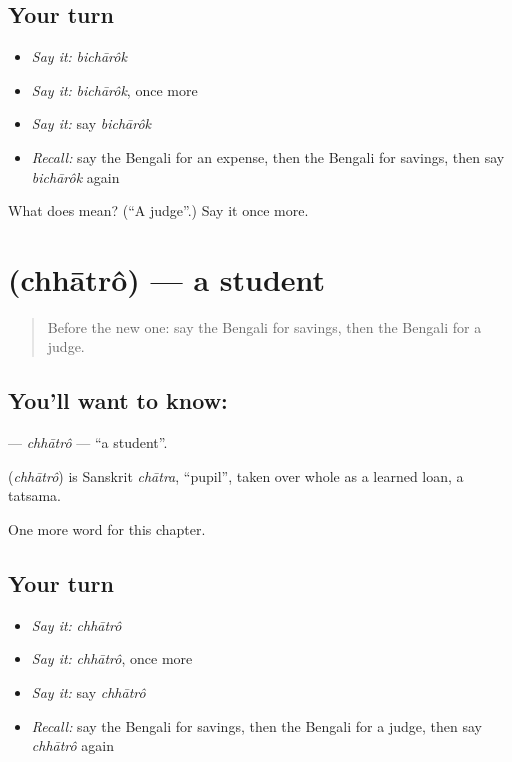 \subsection*{Your turn}
\begin{itemize}
\raggedright
  \item \emph{Say it:} \emph{bichārôk}
  \item \emph{Say it:} \emph{bichārôk}, once more
  \item \emph{Say it:} say \emph{bichārôk}
  \item \emph{Recall:} say the Bengali for an expense, then the Bengali for savings, then say \emph{bichārôk} again
\end{itemize}

\begin{tcolorbox}[breakable,colback=teal!4,colframe=teal!35!black,title={Before you move on}]
What does  mean? (\textquotedblleft{}A judge\textquotedblright{}.) Say it once more.
\end{tcolorbox}
\section[\texorpdfstring{\bn{ছাত্র} (chhātrô)}{ছাত্র (chhātrô)}]{ (chhātrô) — a student}

\label{lesson:BN-C177-chhatro}



\begin{quote}
Before the new one: say the Bengali for savings, then the Bengali for a judge.
\end{quote}

\subsection*{You'll want to know: }
\textbf{} — \emph{chhātrô} — \textquotedblleft{}a student\textquotedblright{}.

\begin{cousinweb}
\textbf{} (\emph{chhātrô}) is Sanskrit \emph{chātra}, \textquotedblleft{}pupil\textquotedblright{}, taken over whole as a learned loan, a tatsama.
\end{cousinweb}

\begin{grammarlens}[title={What you've built}]
One more word for this chapter.
\end{grammarlens}

\subsection*{Your turn}
\begin{itemize}
\raggedright
  \item \emph{Say it:} \emph{chhātrô}
  \item \emph{Say it:} \emph{chhātrô}, once more
  \item \emph{Say it:} say \emph{chhātrô}
  \item \emph{Recall:} say the Bengali for savings, then the Bengali for a judge, then say \emph{chhātrô} again
\end{itemize}

